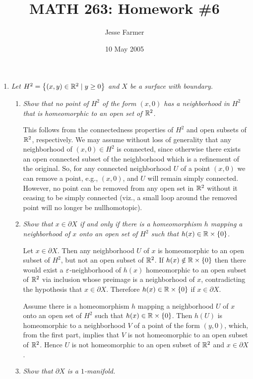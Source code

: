 \documentclass[10pt]{article}
\title{MATH 263: Homework \#6}
\author{Jesse Farmer}
\date{10 May 2005}
\begin{document}
\maketitle
\begin{enumerate}
\item \emph{Let $H^2 = \left\{  (x,y) \in \mathbb{R}^2 \mid y \geq 0 \right\}$ and $X$ be a surface with boundary.}
\begin{enumerate}
\item \emph{Show that no point of $H^2$ of the form $(x,0)$ has a neighborhood in $H^2$ that is homeomorphic to an open set of $\mathbb{R}^2$.}

This follows from the connectedness properties of $H^2$ and open subsets of $\mathbb{R}^2$, respectively.  We may assume without loss of generality that any neighborhood of $(x,0) \in H^2$ is connected, since otherwise there exists an open connected subset of the neighborhood which is a refinement of the original.  So, for any connected neighborhood $U$ of a point $(x,0)$ we can remove a point, e.g., $(x,0)$, and $U$ will remain simply connected.  However, no point can be removed from any open set in $\mathbb{R}^2$ without it ceasing to be simply connected (viz., a small loop around the removed point will no longer be nullhomotopic).


\item \emph{Show that $x \in \partial X$ if and only if there is a homeomorphism $h$ mapping a neighborhood of $x$ onto an open set of $H^2$ such that $h(x) \in \mathbb{R} \times \left\{ 0 \right\}$.}

Let $x \in \partial X$.  Then any neighborhood $U$ of $x$ is homeomorphic to an open subset of $H^2$, but not an open subset of $\mathbb{R}^2$.  If $h(x) \notin \mathbb{R} \times \left\{ 0 \right\}$ then there would exist a $\varepsilon$-neighborhood of $h(x)$ homeomorphic to an open subset of $\mathbb{R}^2$ via inclusion whose preimage is a neighborhood of $x$, contradicting the hypothesis that $x \in \partial X$.  Therefore $h(x) \in \mathbb{R} \times \left\{ 0 \right\}$ if $x \in \partial X$.

Assume there is a homeomorphism $h$ mapping a neighborhood $U$ of $x$ onto an open set of $H^2$ such that $h(x) \in \mathbb{R} \times \left\{ 0 \right\}$.  Then $h(U)$ is homeomorphic to a neighborhood $V$ of a point of the form $(y,0)$, which, from the first part, implies that $V$ is not homeomorphic to an open subset of $\mathbb{R}^2$.  Hence $U$ is not homeomorphic to an open subset of $\mathbb{R}^2$ and $x \in \partial X$.


\item \emph{Show that $\partial X$ is a $1$-manifold.}



\end{enumerate}
\end{enumerate}
\end{document}
